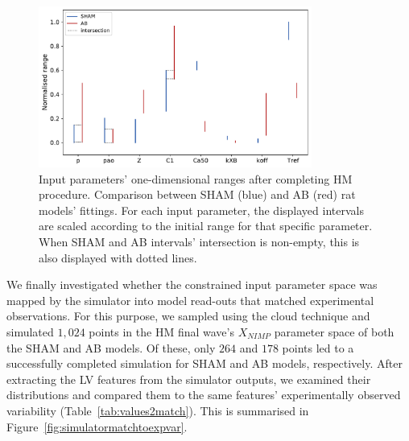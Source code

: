 \begin{figure}[ht!]
    \myfloatalign
    \includegraphics[width=0.8\textwidth]{figures/chapter04/sham_vs_ab_final_ranges.pdf}
    \caption{Input parameters’ one-dimensional ranges after completing HM procedure. Comparison between SHAM (blue) and AB (red) rat models’ fittings. For each input parameter, the displayed intervals are scaled according to the initial range for that specific parameter. When SHAM and AB intervals’ intersection is non-empty, this is also displayed with dotted lines.}
    \label{fig:onedspacered}
\end{figure}


\vspace{0.2cm}
We finally investigated whether the constrained input parameter space was mapped by the simulator into model read-outs that matched experimental observations. For this purpose, we sampled using the cloud technique and simulated $1,024$ points in the HM final wave's $X_{NIMP}$ parameter space of both the SHAM and AB models. Of these, only $264$ and $178$ points led to a successfully completed simulation for SHAM and AB models, respectively. After extracting the LV features from the simulator outputs, we examined their distributions and compared them to the same features' experimentally observed variability (Table~\ref{tab:values2match}). This is summarised in Figure~\ref{fig:simulatormatchtoexpvar}.

